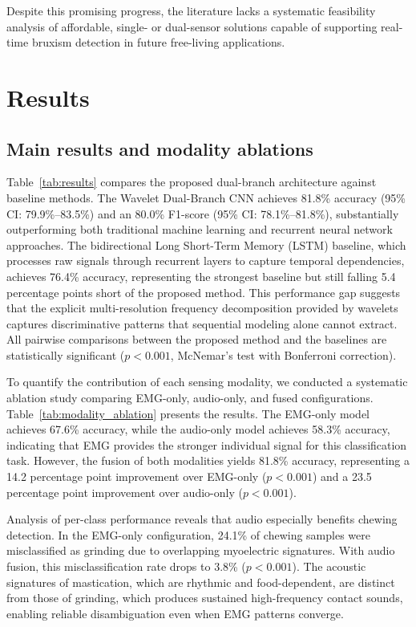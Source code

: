 \documentclass[pdflatex,sn-nature,iicol]{sn-jnl}
\begin{document}
Despite this promising progress, the literature lacks a systematic feasibility analysis of affordable, single- or dual-sensor solutions capable of supporting real-time bruxism detection in future free-living applications.


\section{Results}
\subsection{Main results and modality ablations}

Table~\ref{tab:results} compares the proposed dual-branch architecture against baseline methods. The Wavelet Dual-Branch CNN achieves 81.8\% accuracy (95\% CI: 79.9\%--83.5\%) and an 80.0\% F1-score (95\% CI: 78.1\%--81.8\%), substantially outperforming both traditional machine learning and recurrent neural network approaches. The bidirectional Long Short-Term Memory (LSTM) baseline, which processes raw signals through recurrent layers to capture temporal dependencies, achieves 76.4\% accuracy, representing the strongest baseline but still falling 5.4 percentage points short of the proposed method. This performance gap suggests that the explicit multi-resolution frequency decomposition provided by wavelets captures discriminative patterns that sequential modeling alone cannot extract. All pairwise comparisons between the proposed method and the baselines are statistically significant ($p < 0.001$, McNemar's test with Bonferroni correction).

To quantify the contribution of each sensing modality, we conducted a systematic ablation study comparing EMG-only, audio-only, and fused configurations. Table~\ref{tab:modality_ablation} presents the results. The EMG-only model achieves 67.6\% accuracy, while the audio-only model achieves 58.3\% accuracy, indicating that EMG provides the stronger individual signal for this classification task. However, the fusion of both modalities yields 81.8\% accuracy, representing a 14.2 percentage point improvement over EMG-only ($p < 0.001$) and a 23.5 percentage point improvement over audio-only ($p < 0.001$).

Analysis of per-class performance reveals that audio especially benefits chewing detection. In the EMG-only configuration, 24.1\% of chewing samples were misclassified as grinding due to overlapping myoelectric signatures. With audio fusion, this misclassification rate drops to 3.8\% ($p < 0.001$). The acoustic signatures of mastication, which are rhythmic and food-dependent, are distinct from those of grinding, which produces sustained high-frequency contact sounds, enabling reliable disambiguation even when EMG patterns converge.
\end{document}
